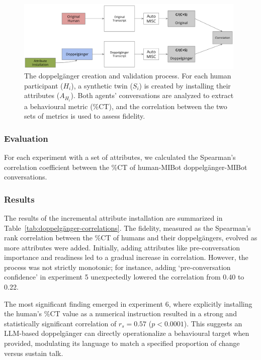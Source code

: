 \begin{figure}[htpb]
    \centering
    \includegraphics[width=0.98\textwidth]{fig/doppelganger_process.png}
    \caption{The doppelgänger creation and validation process. For each human participant ($H_i$), a synthetic twin ($S_i$) is created by installing their attributes ($A_{H_i}$). Both agents' conversations are analyzed to extract a behavioural metric (\%CT), and the correlation between the two sets of metrics is used to assess fidelity.}
    \label{fig:doppelgänger-creation-process}
\end{figure}


\subsubsection{Evaluation}
For each experiment with a set of attributes, we calculated the Spearman's correlation coefficient between the \%CT of human-MIBot doppelgänger-MIBot conversations.



\subsubsection{Results}
The results of the incremental attribute installation are summarized in Table~\ref{tab:doppelgänger-correlations}. The fidelity, measured as the Spearman's rank correlation between the \%CT of humans and their doppelgängers, evolved as more attributes were added. Initially, adding attributes like pre-conversation importance and readiness led to a gradual increase in correlation. However, the process was not strictly monotonic; for instance, adding `pre-conversation confidence' in experiment 5 unexpectedly lowered the correlation from 0.40 to 0.22.

The most significant finding emerged in experiment 6, where explicitly installing the human's \%CT value as a numerical instruction resulted in a strong and statistically significant correlation of $r_s = 0.57$ ($p < 0.0001$). This suggests an LLM-based doppelgänger can directly operationalize a behavioural target when provided, modulating its language to match a specified proportion of change versus sustain talk.

